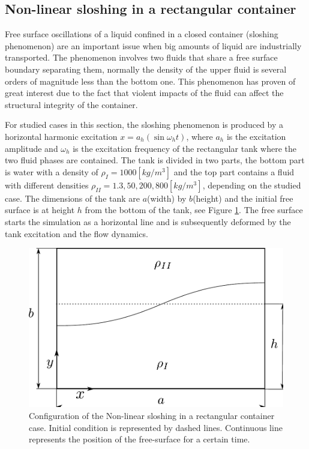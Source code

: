 \subsection{Non-linear sloshing in a rectangular container}%

Free surface oscillations of a liquid confined in a closed container (sloshing phenomenon) are an important issue when big amounts of liquid are industrially transported. The phenomenon involves two fluids that share a free surface boundary separating them, normally the density of the upper fluid is several orders of magnitude less than the bottom one. This phenomenon has proven of great interest due to the fact that violent impacts of the fluid can affect the structural integrity of the container.

For studied cases in this section, the sloshing phenomenon is produced by a horizontal harmonic excitation $x = a_h (\sin \omega_h t)$, where $a_h$ is the excitation amplitude and $\omega_h$ is the excitation frequency of the rectangular tank where the two fluid phases are contained. The tank is divided in two parts, the bottom part is water with a density of $\rho_{I} = 1000 [kg/m^3]$ and the top part contains a fluid with different densities $\rho_{II} = 1.3, 50, 200, 800 [kg/m^3]$, depending on the studied case. The dimensions of the tank are $a$(width) by $b$(height) and the initial free surface is at height $h$ from the bottom of the tank, see Figure \ref{fg:ansari-config}. The free surface starts the simulation as a horizontal line and is subsequently deformed by the tank excitation and the flow dynamics.

\begin{figure}[H]
  \begin{center}
      \includegraphics[width=.7\columnwidth]{images/ansari_config.pdf}
  \end{center}
  \caption{\label{fg:ansari-config} Configuration of the Non-linear sloshing in a rectangular container case. Initial condition is represented by dashed lines. Continuous line represents the position of the free-surface for a certain time.}
\end{figure}

